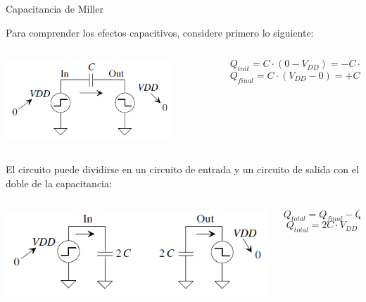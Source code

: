 \documentclass[t,aspectratio=169]{beamer}
\begin{document}
\begin{frame}{Capacitancia de Miller}

Para comprender los efectos capacitivos, considere primero lo siguiente:

\vspace{-3mm}
\begin{columns}

\begin{column}{0.5\textwidth}

\centering
\includegraphics[width=0.8\textwidth]{figuras/miller1.png}

\end{column}

\begin{column}{0.5\textwidth}

\[ Q_{init} = C \cdot (0 - V_{DD}) = -C \cdot V_{DD} \]
\[ Q_{final} = C \cdot (V_{DD} - 0) = +C \cdot V_{DD} \]

\end{column}

\end{columns}

\vspace{3mm}
El circuito puede dividirse en un circuito de entrada y un circuito de salida con el doble de la capacitancia:

\begin{columns}

\begin{column}{0.6\textwidth}

\centering
\includegraphics[width=\textwidth]{figuras/miller2.png}

\end{column}

\begin{column}{0.4\textwidth}

\[ Q_{total} = Q_{final} - Q_{inicial} \]
\[ Q_{total} = 2C \cdot V_{DD} \]

\end{column}

\end{columns}

\end{frame}
\end{document}

